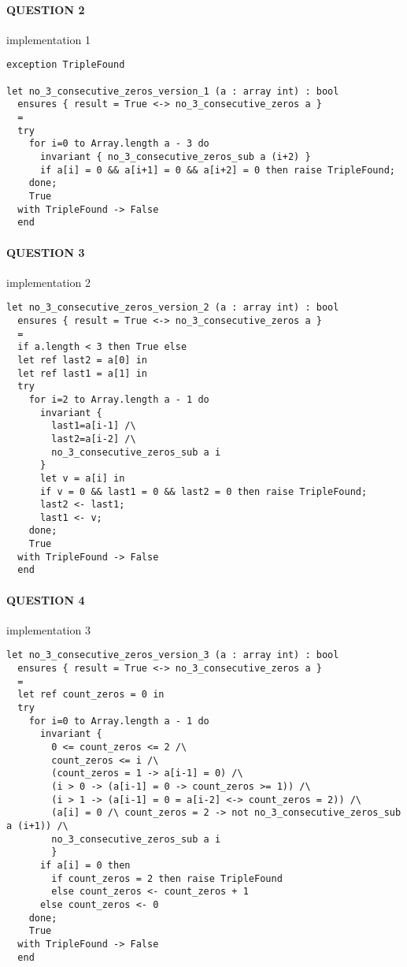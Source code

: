 \hypertarget{question-2}{%
\paragraph{QUESTION 2}\label{question-2}}

implementation 1

\begin{verbatim}
exception TripleFound

let no_3_consecutive_zeros_version_1 (a : array int) : bool
  ensures { result = True <-> no_3_consecutive_zeros a }
  =
  try
    for i=0 to Array.length a - 3 do
      invariant { no_3_consecutive_zeros_sub a (i+2) }
      if a[i] = 0 && a[i+1] = 0 && a[i+2] = 0 then raise TripleFound;
    done;
    True
  with TripleFound -> False
  end
\end{verbatim}

\hypertarget{question-3}{%
\paragraph{QUESTION 3}\label{question-3}}

implementation 2

\begin{verbatim}
let no_3_consecutive_zeros_version_2 (a : array int) : bool
  ensures { result = True <-> no_3_consecutive_zeros a }
  =
  if a.length < 3 then True else
  let ref last2 = a[0] in
  let ref last1 = a[1] in
  try
    for i=2 to Array.length a - 1 do
      invariant {
        last1=a[i-1] /\
        last2=a[i-2] /\
        no_3_consecutive_zeros_sub a i
      }
      let v = a[i] in
      if v = 0 && last1 = 0 && last2 = 0 then raise TripleFound;
      last2 <- last1;
      last1 <- v;
    done;
    True
  with TripleFound -> False
  end
\end{verbatim}

\hypertarget{question-4}{%
\paragraph{QUESTION 4}\label{question-4}}

implementation 3

\begin{verbatim}
let no_3_consecutive_zeros_version_3 (a : array int) : bool
  ensures { result = True <-> no_3_consecutive_zeros a }
  =
  let ref count_zeros = 0 in
  try
    for i=0 to Array.length a - 1 do
      invariant {
        0 <= count_zeros <= 2 /\
        count_zeros <= i /\
        (count_zeros = 1 -> a[i-1] = 0) /\
        (i > 0 -> (a[i-1] = 0 -> count_zeros >= 1)) /\
        (i > 1 -> (a[i-1] = 0 = a[i-2] <-> count_zeros = 2)) /\
        (a[i] = 0 /\ count_zeros = 2 -> not no_3_consecutive_zeros_sub a (i+1)) /\
        no_3_consecutive_zeros_sub a i
        }
      if a[i] = 0 then
        if count_zeros = 2 then raise TripleFound
        else count_zeros <- count_zeros + 1
      else count_zeros <- 0
    done;
    True
  with TripleFound -> False
  end
\end{verbatim}

